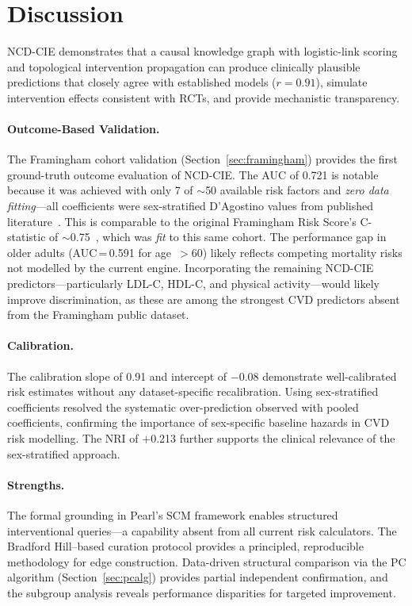 \documentclass[runningheads]{llncs}
\begin{document}
\section{Discussion}\label{sec:discussion}

NCD-CIE demonstrates that a causal knowledge graph with logistic-link
scoring and topological intervention propagation can produce
clinically plausible predictions that closely agree with established
models ($r = 0.91$), simulate intervention effects consistent with
RCTs, and provide mechanistic transparency.

\paragraph{Outcome-Based Validation.}
The Framingham cohort validation (Section~\ref{sec:framingham})
provides the first ground-truth outcome evaluation of NCD-CIE.
The AUC of 0.721 is notable because it was achieved with only 7 of
${\sim}$50 available risk factors and \emph{zero data fitting}---all
coefficients were sex-stratified D'Agostino values from published
literature~\cite{dagostino2008}.  This is comparable to the original
Framingham Risk Score's C-statistic of
${\sim}$0.75~\cite{dagostino2008}, which was \emph{fit} to
this same cohort.  The performance gap in older adults
(AUC\,=\,0.591 for age~${>}$60) likely reflects competing mortality
risks not modelled by the current engine.  Incorporating the remaining
NCD-CIE predictors---particularly LDL-C, HDL-C, and physical
activity---would likely improve discrimination, as these are among the
strongest CVD predictors absent from the Framingham public dataset.

\paragraph{Calibration.}
The calibration slope of 0.91 and intercept of $-$0.08 demonstrate
well-calibrated risk estimates without any dataset-specific
recalibration.  Using sex-stratified coefficients resolved the
systematic over-prediction observed with pooled coefficients,
confirming the importance of sex-specific baseline hazards in CVD
risk modelling.  The NRI of $+$0.213 further supports the clinical
relevance of the sex-stratified approach.

\paragraph{Strengths.}
The formal grounding in Pearl's SCM framework enables structured
interventional queries---a capability absent from all current risk
calculators.  The Bradford Hill--based curation
protocol provides a principled, reproducible methodology for edge
construction.  Data-driven structural comparison via the PC algorithm
(Section~\ref{sec:pcalg}) provides partial independent confirmation,
and the subgroup analysis reveals performance
disparities for targeted improvement.
\end{document}
